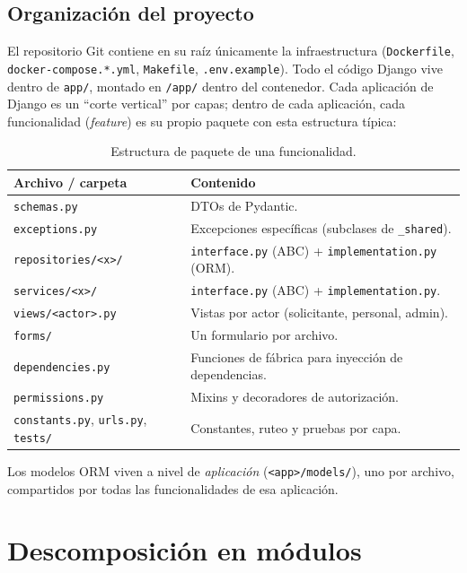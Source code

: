 \documentclass[12pt,letterpaper]{report}
\begin{document}
\section{Organización del proyecto}

El repositorio Git contiene en su raíz únicamente la infraestructura
(\texttt{Dockerfile}, \texttt{docker-compose.*.yml}, \texttt{Makefile},
\texttt{.env.example}). Todo el código Django vive dentro de \texttt{app/},
montado en \texttt{/app/} dentro del contenedor. Cada aplicación de Django es un
``corte vertical'' por capas; dentro de cada aplicación, cada funcionalidad
(\textit{feature}) es su propio paquete con esta estructura típica:

\begin{table}[H]
\centering
\caption{Estructura de paquete de una funcionalidad.}
\begin{tabularx}{\textwidth}{L{5.5cm} X}
\toprule
\textbf{Archivo / carpeta} & \textbf{Contenido} \\
\midrule
\texttt{schemas.py} & DTOs de Pydantic. \\
\texttt{exceptions.py} & Excepciones específicas (subclases de \texttt{\_shared}). \\
\texttt{repositories/<x>/} & \texttt{interface.py} (ABC) + \texttt{implementation.py} (ORM). \\
\texttt{services/<x>/} & \texttt{interface.py} (ABC) + \texttt{implementation.py}. \\
\texttt{views/<actor>.py} & Vistas por actor (solicitante, personal, admin). \\
\texttt{forms/} & Un formulario por archivo. \\
\texttt{dependencies.py} & Funciones de fábrica para inyección de dependencias. \\
\texttt{permissions.py} & Mixins y decoradores de autorización. \\
\texttt{constants.py}, \texttt{urls.py}, \texttt{tests/} & Constantes, ruteo y pruebas por capa. \\
\bottomrule
\end{tabularx}
\end{table}

Los modelos ORM viven a nivel de \emph{aplicación} (\texttt{<app>/models/}), uno
por archivo, compartidos por todas las funcionalidades de esa aplicación.

\chapter{Descomposición en módulos}
\end{document}
